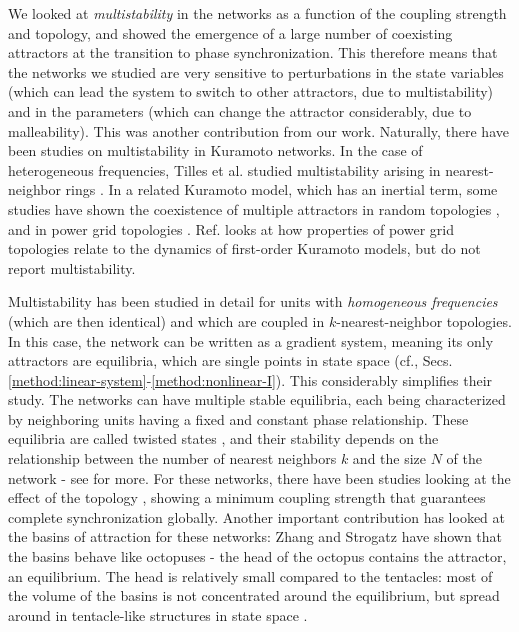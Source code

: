 We looked at \textit{multistability} in the networks as a function of the coupling strength and topology, and showed the emergence of a large number of coexisting attractors at the transition to phase synchronization. This therefore means that the networks we studied are very sensitive to perturbations in the state variables (which can lead the system to switch to other attractors, due to multistability) and in the parameters (which can change the attractor considerably, due to malleability). This was another contribution from our work. Naturally, there have been studies on multistability in Kuramoto networks. In the case of heterogeneous frequencies, Tilles et al. studied multistability arising in nearest-neighbor rings \cite{tilles2011multistable}. In a related Kuramoto model, which has an inertial term, some studies have shown the coexistence of multiple attractors in random topologies \cite{gelbrecht2020monte}, and in power grid topologies \cite{hellmann2020network, halekotte2021transient}. Ref. \cite{potratzki2024synchronization} looks at how properties of power grid topologies relate to the dynamics of first-order Kuramoto models, but do not report multistability.

Multistability has been studied in detail for units with \textit{homogeneous frequencies} (which are then identical) and which are coupled in $k$-nearest-neighbor topologies. In this case, the network can be written as a gradient system, meaning its only attractors are equilibria, which are single points in state space (cf., Secs. \ref{method:linear-system}-\ref{method:nonlinear-I}). This considerably simplifies their study. The networks can have multiple stable equilibria, each being characterized by neighboring units having a fixed and constant phase relationship. These equilibria are called twisted states \cite{wiley2006the}, and their stability depends on the relationship between the number of nearest neighbors $k$ and the size $N$ of the network \cite{wiley2006the} - see  for more. For these networks, there have been studies looking at the effect of the topology \cite{townsend2020dense}, showing a minimum coupling strength that guarantees complete synchronization globally. Another important contribution has looked at the basins of attraction for these networks: Zhang and Strogatz have shown that the basins behave like octopuses - the head of the octopus contains the attractor, an equilibrium. The head is relatively small compared to the tentacles: most of the volume of the basins is not concentrated around the equilibrium, but spread around in tentacle-like structures in state space \cite{zhang2021basins}. 

